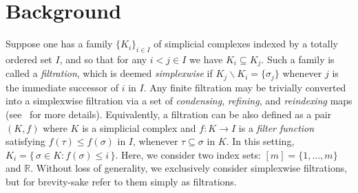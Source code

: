 \documentclass[sn-mathphys]{sn-jnl}
\begin{document}
\section{Background}\label{sec:background} 
Suppose one has a family $\{K_i\}_{i\in I}$ of simplicial complexes indexed by a totally ordered   set $I$, and so that for any $i< j \in I$ we have $K_i \subseteq K_j$. 
Such a family is called a \emph{filtration},
which is deemed \emph{simplexwise} if $K_j \smallsetminus K_i = \{\sigma_j\}$ 
whenever $j$ is the immediate successor of $i$ in $I$.
Any finite filtration may be trivially converted into a simplexwise filtration via a set of \emph{condensing}, \emph{refining}, and \emph{reindexing} maps (see~\cite{bauer2021ripser} for more details). 
Equivalently, a filtration can be also defined as a pair $(K, f)$ where $K$ is a simplicial complex and $f : K \to I$ is a \emph{filter function}  satisfying $f(\tau) \leq f(\sigma)$ in $I$, whenever $\tau \subseteq \sigma$ in  $  K$. In this setting, $K_i = \{ \, \sigma \in K :  f(\sigma) \leq i \, \}$. Here, we consider two index sets: $[m] = \{ 1, \dots, m\}$ and $\mathbb{R}$. 
Without loss of generality, we exclusively consider simplexwise filtrations, but for brevity-sake refer to them simply as filtrations. 
\end{document}
